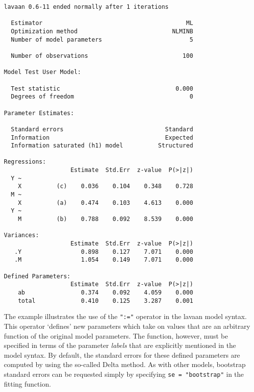 \begin{verbatim}
lavaan 0.6-11 ended normally after 1 iterations

  Estimator                                         ML
  Optimization method                           NLMINB
  Number of model parameters                         5
                                                      
  Number of observations                           100
                                                      
Model Test User Model:
                                                      
  Test statistic                                 0.000
  Degrees of freedom                                 0

Parameter Estimates:

  Standard errors                             Standard
  Information                                 Expected
  Information saturated (h1) model          Structured

Regressions:
                   Estimate  Std.Err  z-value  P(>|z|)
  Y ~                                                 
    X          (c)    0.036    0.104    0.348    0.728
  M ~                                                 
    X          (a)    0.474    0.103    4.613    0.000
  Y ~                                                 
    M          (b)    0.788    0.092    8.539    0.000

Variances:
                   Estimate  Std.Err  z-value  P(>|z|)
   .Y                 0.898    0.127    7.071    0.000
   .M                 1.054    0.149    7.071    0.000

Defined Parameters:
                   Estimate  Std.Err  z-value  P(>|z|)
    ab                0.374    0.092    4.059    0.000
    total             0.410    0.125    3.287    0.001
\end{verbatim}

The example illustrates the use of the \texttt{":="} operator in the
lavaan model syntax. This operator `defines' new parameters which take
on values that are an arbitrary function of the original model
parameters. The function, however, must be specified in terms of the
parameter \emph{labels} that are explicitly mentioned in the model
syntax. By default, the standard errors for these defined parameters are
computed by using the so-called Delta method. As with other models,
bootstrap standard errors can be requested simply by specifying
\texttt{se\ =\ "bootstrap"} in the fitting function.
